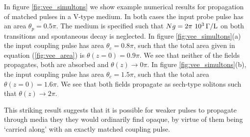     In figure \ref{fig:vee_simultons} we show example numerical results for
    propagation of matched pulses in a V-type medium. In both cases the input
    probe pulse has an area $\theta_p = 0.5 \pi$. The medium is specified such
    that $Ng = \unit[2\pi~10^3]{\Gamma/L}$ on both transitions and spontaneous
    decay is neglected. In figure \ref{fig:vee_simultons}(a) the input coupling
    pulse has area $\theta_c = 0.8 \pi$, such that the total area given in
    equation (\ref{fig:vee_area}) is $\theta(z{=}0) = 0.9 \pi$. We see that
    neither of the fields propagates, both are absorbed and $\theta(z)
    \rightarrow 0 \pi$. In figure \ref{fig:vee_simultons}(b), the input
    coupling pulse has area $\theta_c = 1.5 \pi$, such that the total area
    $\theta(z{=}0) = 1.6 \pi$. We see that both fields propagate as sech-type
    solitons such that $\theta(z) \rightarrow 2 \pi$.

    This striking result suggests that it is possible for weaker pulses to
    propagate through media they they would ordinarily find opaque, by virtue of
    them being `carried along' with an exactly matched coupling pulse.


